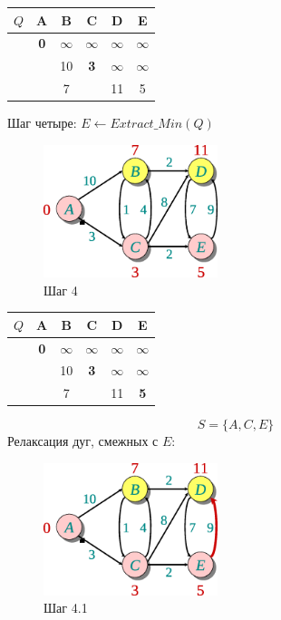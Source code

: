 \documentclass[11pt]{article}
\begin{document}
\begin{center}
\begin{tabular}{|r|c|c|c|c|c|}
  \hline
     $Q$ & A & \textbf{B} & C & \textbf{D} & \textbf{E} \\
  \hline
         & \textbf{0} & $\infty$ & $\infty$ & $\infty$ & $\infty$ \\
  \hline
         & & 10 & \textbf{3} & $\infty$ & $\infty$ \\
  \hline
         & & 7 & & 11 & 5 \\
  \hline
\end{tabular}
\end{center}
\newpage
Шаг четыре: $E \leftarrow Extract\_Min(Q)$
\begin{figure}[h!]
  \centering
  \includegraphics[width=2in]{lecture17/dijkstra4.eps}
  \caption{Шаг 4}
\end{figure}
\begin{center}
\begin{tabular}{|r|c|c|c|c|c|}
  \hline
     $Q$ & A & \textbf{B} & C & \textbf{D} & E \\
  \hline
         & \textbf{0} & $\infty$ & $\infty$ & $\infty$ & $\infty$ \\
  \hline
         & & 10 & \textbf{3} & $\infty$ & $\infty$ \\
  \hline
         & & 7 & & 11 & \textbf{5} \\
  \hline
\end{tabular}
\end{center}
\begin{equation*}
  S = \{A, C, E\}
\end{equation*}
Релаксация дуг, смежных с $E$:
\begin{figure}[h!]
  \centering
  \includegraphics[width=2in]{lecture17/dijkstra41.eps}
  \caption{Шаг 4.1}
\end{figure}
\end{document}
